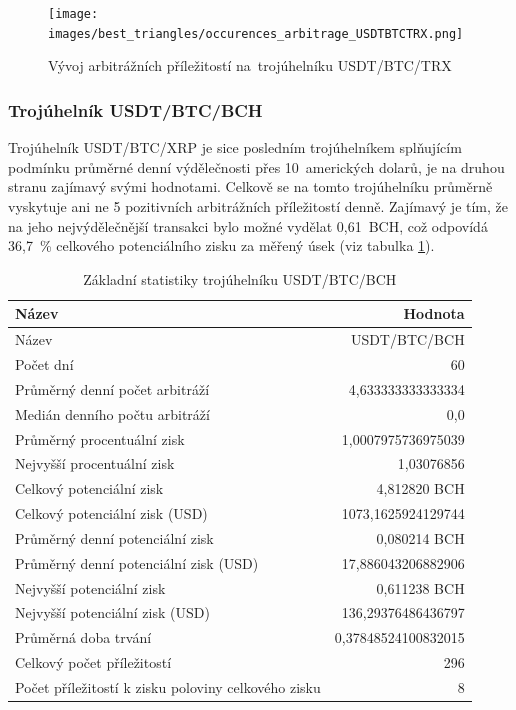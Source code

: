 \documentclass[thesis=B,czech]{FITthesis}[2019/03/21]
\begin{document}
\begin{figure}\centering
	\texttt{[image: images/best\_triangles/occurences\_arbitrage\_USDTBTCTRX.png]}
	\caption{Vývoj arbitrážních příležitostí na~trojúhelníku USDT/BTC/TRX }\label{occurences_arbitrage_USDTBTCTRX}
\end{figure}

\subsubsection{Trojúhelník USDT/BTC/BCH}
Trojúhelník USDT/BTC/XRP je sice posledním trojúhelníkem splňujícím podmínku průměrné denní výdělečnosti přes 10~amerických dolarů, je na druhou stranu zajímavý svými hodnotami. Celkově se na tomto trojúhelníku průměrně vyskytuje ani ne 5 pozitivních arbitrážních příležitostí denně. Zajímavý je tím, že na jeho nejvýdělečnější transakci bylo možné vydělat 0,61~BCH, což odpovídá 36,7~\% celkového potenciálního zisku za měřený úsek (viz tabulka \ref{USDTBTCBCH_stats}).

\begin{table}\centering
\caption{Základní statistiky trojúhelníku USDT/BTC/BCH}
\label{USDTBTCBCH_stats}
\begin{tabular}{|| l | r ||}
\hline Název & Hodnota \\ 
\hline\hline Název & USDT/BTC/BCH \\ 
\hline Počet dní & 60 \\ 
\hline Průměrný denní počet arbitráží & 4,633333333333334 \\ 
\hline Medián denního počtu arbitráží & 0,0 \\ 
\hline Průměrný procentuální zisk & 1,0007975736975039 \\ 
\hline Nejvyšší procentuální zisk & 1,03076856 \\ 
\hline Celkový potenciální zisk & 4,812820 BCH \\ 
\hline Celkový potenciální zisk (USD) & 1073,1625924129744 \\ 
\hline Průměrný denní potenciální zisk & 0,080214 BCH \\ 
\hline Průměrný denní potenciální zisk (USD) & 17,886043206882906 \\ 
\hline Nejvyšší potenciální zisk & 0,611238 BCH \\ 
\hline Nejvyšší potenciální zisk (USD) & 136,29376486436797 \\ 
\hline Průměrná doba trvání & 0,37848524100832015 \\ 
\hline Celkový počet příležitostí & 296 \\ 
\hline Počet příležitostí k zisku poloviny celkového zisku & 8 \\ 
\hline
\end{tabular}
\end{table}
\end{document}
